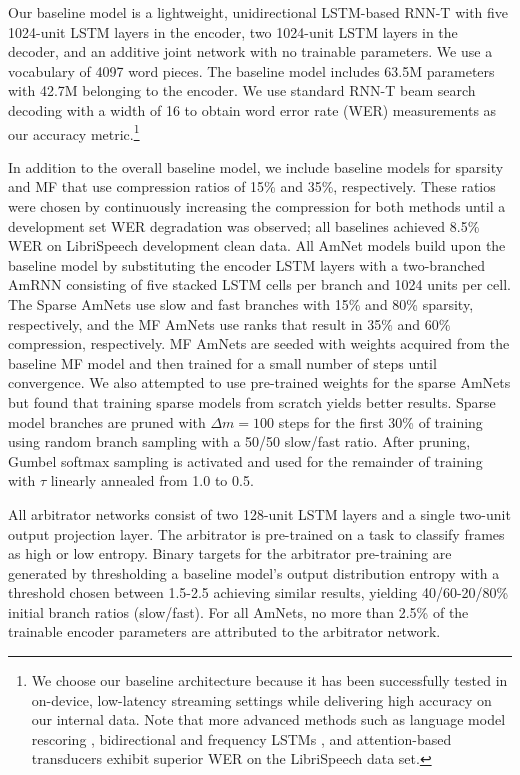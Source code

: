 \documentclass[a4paper]{article}
\newcommand{\steps}{m}
\begin{document}
Our baseline model is a lightweight, unidirectional LSTM-based RNN-T with five 1024-unit LSTM layers in the encoder, two 1024-unit LSTM layers in the decoder, and an additive joint network with no trainable parameters. 
We use a vocabulary of 4097 word pieces. 
The baseline model includes 63.5M parameters with 42.7M belonging to the encoder. 
We use standard RNN-T beam search decoding with a width of 16 to obtain word error rate (WER) measurements as our accuracy metric.\footnote{We choose our baseline architecture because it has been successfully tested in on-device, low-latency streaming settings while delivering high accuracy on our internal data. Note that more advanced methods such as language model rescoring \cite{Li2020-a}, bidirectional and frequency LSTMs \cite{Graves2013-BiLSTM, Li2016}, and attention-based transducers \cite{Li2020-b, Zhao2020, Tian2019} exhibit superior WER on the LibriSpeech data set.}

In addition to the overall baseline model, we include baseline models for sparsity and MF that use compression ratios of 15\% and 35\%, respectively. 
These ratios were chosen by continuously increasing the compression for both methods until a development set WER degradation was observed; all baselines achieved 8.5\% WER on LibriSpeech development clean data. 
All AmNet models build upon the baseline model by substituting the encoder LSTM layers with a two-branched AmRNN consisting of five stacked LSTM cells per branch and 1024 units per cell. 
The Sparse AmNets use slow and fast branches with 15\% and 80\% sparsity, respectively, and the MF AmNets use ranks that result in 35\% and 60\% compression, respectively. 
MF AmNets are seeded with weights acquired from the baseline MF model and then trained for a small number of steps until convergence. 
We also attempted to use pre-trained weights for the sparse AmNets but found that training sparse models from scratch yields better results. 
Sparse model branches are pruned with $\Delta \steps=100$ steps for the first 30\% of training using random branch sampling with a 50/50 slow/fast ratio. 
After pruning, Gumbel softmax sampling is activated and used for the remainder of training with $\tau$ linearly annealed from 1.0 to 0.5. 

All arbitrator networks consist of two 128-unit LSTM layers and a single two-unit output projection layer. The arbitrator is pre-trained on a task to classify frames as high or low entropy. Binary targets for the arbitrator pre-training are generated by thresholding a baseline model's output distribution entropy with a threshold chosen between 1.5-2.5 achieving similar results, yielding 40/60-20/80\% initial branch ratios (slow/fast). For all AmNets, no more than 2.5\% of the trainable encoder parameters are attributed to the arbitrator network.
\end{document}
